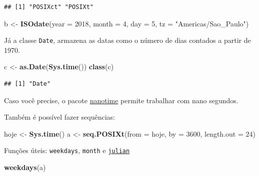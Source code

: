 \documentclass[]{book}
\newenvironment{Shaded}{\begin{snugshade}}{\end{snugshade}}
\newcommand{\KeywordTok}[1]{\textcolor[rgb]{0.13,0.29,0.53}{\textbf{#1}}}
\newcommand{\DataTypeTok}[1]{\textcolor[rgb]{0.13,0.29,0.53}{#1}}
\newcommand{\DecValTok}[1]{\textcolor[rgb]{0.00,0.00,0.81}{#1}}
\newcommand{\StringTok}[1]{\textcolor[rgb]{0.31,0.60,0.02}{#1}}
\newcommand{\NormalTok}[1]{#1}
\theoremstyle{definition}
\theoremstyle{definition}
\theoremstyle{definition}
\theoremstyle{remark}
\begin{document}
\begin{verbatim}
## [1] "POSIXct" "POSIXt"
\end{verbatim}

\begin{Shaded}
\begin{Highlighting}[]
\NormalTok{b <-}\StringTok{ }\KeywordTok{ISOdate}\NormalTok{(}\DataTypeTok{year =} \DecValTok{2018}\NormalTok{, }\DataTypeTok{month =} \DecValTok{4}\NormalTok{, }\DataTypeTok{day =} \DecValTok{5}\NormalTok{, }\DataTypeTok{tz =} \StringTok{"Americas/Sao_Paulo"}\NormalTok{)}
\end{Highlighting}
\end{Shaded}

Já a classe \texttt{Date}, armazena as datas como o número de dias
contados a partir de 1970.

\begin{Shaded}
\begin{Highlighting}[]
\NormalTok{c <-}\StringTok{ }\KeywordTok{as.Date}\NormalTok{(}\KeywordTok{Sys.time}\NormalTok{())}
\KeywordTok{class}\NormalTok{(c)}
\end{Highlighting}
\end{Shaded}

\begin{verbatim}
## [1] "Date"
\end{verbatim}

Caso você precise, o pacote
\href{https://github.com/eddelbuettel/nanotime}{nanotime} permite
trabalhar com nano segundos.

Também é possível fazer sequências:

\begin{Shaded}
\begin{Highlighting}[]
\NormalTok{hoje <-}\StringTok{ }\KeywordTok{Sys.time}\NormalTok{()}
\NormalTok{a <-}\StringTok{ }\KeywordTok{seq.POSIXt}\NormalTok{(}\DataTypeTok{from =}\NormalTok{ hoje, }\DataTypeTok{by =} \DecValTok{3600}\NormalTok{, }\DataTypeTok{length.out =} \DecValTok{24}\NormalTok{)}
\end{Highlighting}
\end{Shaded}

Funções úteis: \texttt{weekdays}, \texttt{month} e
\href{https://en.wikipedia.org/wiki/Julian_day}{\texttt{julian}}

\begin{Shaded}
\begin{Highlighting}[]
\KeywordTok{weekdays}\NormalTok{(a)}
\end{Highlighting}
\end{Shaded}
\end{document}
